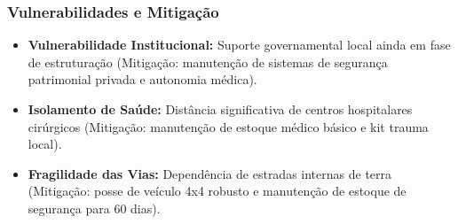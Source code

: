\subsubsection{Vulnerabilidades e
Mitigação}

\begin{itemize}
\tightlist
\item
  \textbf{Vulnerabilidade Institucional:} Suporte governamental local
  ainda em fase de estruturação (Mitigação: manutenção de sistemas de
  segurança patrimonial privada e autonomia médica).
\item
  \textbf{Isolamento de Saúde:} Distância significativa de centros
  hospitalares cirúrgicos (Mitigação: manutenção de estoque médico
  básico e kit trauma local).
\item
  \textbf{Fragilidade das Vias:} Dependência de estradas internas de
  terra (Mitigação: posse de veículo 4x4 robusto e manutenção de estoque
  de segurança para 60 dias).
\end{itemize}

